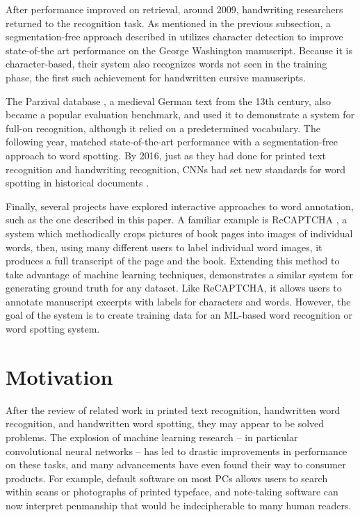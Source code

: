 \documentclass[final]{ukthesis}
\begin{document}
After performance improved on retrieval, around 2009, handwriting researchers returned to the recognition task. As mentioned in the previous subsection, a segmentation-free approach described in \cite{howe2009finding} utilizes character detection to improve state-of-the art performance on the George Washington manuscript. Because it is character-based, their system also recognizes words not seen in the training phase, the first such achievement for handwritten cursive manuscripts.

The Parzival database \cite{fischer2010ground}, a medieval German text from the 13th century, also became a popular evaluation benchmark, and \cite{fischer2014combined} used it to demonstrate a system for full-on recognition, although it relied on a predetermined vocabulary. The following year, \cite{rusinol2015efficient} matched state-of-the-art performance with a segmentation-free approach to word spotting. By 2016, just as they had done for printed text recognition and handwriting recognition, CNNs had set new standards for word spotting in historical documents \cite{sudholt2016phocnet,zhong2016spottingnet,krishnan2016deep} .

Finally, several projects have explored interactive approaches to word annotation, such as the one described in this paper. A familiar example is ReCAPTCHA \cite{von2008recaptcha}, a system which methodically crops pictures of book pages into images of individual words, then, using many different users to label individual word images, it produces a full transcript of the page and the book. Extending this method to take advantage of machine learning techniques, \cite{biller2013webgt} demonstrates a similar system for generating ground truth for any dataset. Like ReCAPTCHA, it allows users to annotate manuscript excerpts with labels for characters and words. However, the goal of the system is to create training data for an ML-based word recognition or word spotting system.


%
%
\section{Motivation}
After the review of related work in printed text recognition, handwritten word recognition, and handwritten word spotting, they may appear to be solved problems. The explosion of machine learning research -- in particular convolutional neural networks -- has led to drastic improvements in performance on these tasks, and many advancements have even found their way to consumer products. For example, default software on most PCs allows users to search within scans or photographs of printed typeface, and note-taking software can now interpret penmanship that would be indecipherable to many human readers.
\end{document}

